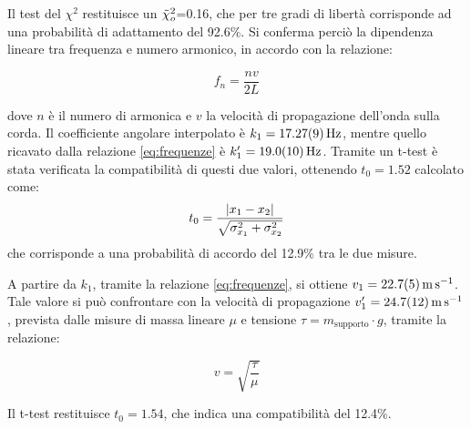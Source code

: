 Il test del $\chi^2$ restituisce un $\Tilde{\chi}_o^2$=0.16, che per tre gradi di libertà corrisponde ad una probabilità di adattamento del 92.6\%. Si conferma perciò la dipendenza lineare tra frequenza e numero armonico, in accordo con la relazione:

\begin{equation}
  f_n = \frac{nv}{2L}
  \label{eq:frequenze}
\end{equation}

dove $n$ è il numero di armonica e $v$ la velocità di propagazione dell'onda sulla corda.
Il coefficiente angolare interpolato è $k_1 = \qty{17.27 \pm 0.09}{\hertz}$, mentre quello ricavato dalla relazione \eqref{eq:frequenze} è $k'_1 = \qty{19.0 \pm 1.0}{\hertz}$. Tramite un t-test è stata verificata la compatibilità di questi due valori, ottenendo $t_0 = 1.52$ calcolato come:
\begin{equation}
t_0 = \frac{\lvert x_1-x_2\rvert}{\sqrt{{\sigma}_{x_1}^2+{\sigma}_{x_2}^2}}
\label{eq:t_test}
\end{equation}
 che corrisponde a una probabilità di accordo del 12.9\% tra le due misure.

 A partire da $k_1$, tramite la relazione \eqref{eq:frequenze}, si ottiene $v_1 = \qty{22.7 \pm 0.5}{\meter\per\second}$. Tale valore si può confrontare con la velocità di propagazione $v'_1 = \qty{24.7 \pm 1.2}{\meter\per\second}$, prevista dalle misure di massa lineare $\mu$ e tensione $\tau = m_{\text{supporto}}\cdot g$, tramite la relazione:

\begin{equation}
  v = \sqrt{\frac{\tau}{\mu}} 
  \label{eq:v-propagazione}
\end{equation}

Il t-test restituisce $t_0 = 1.54$, che indica una compatibilità del 12.4\%.

